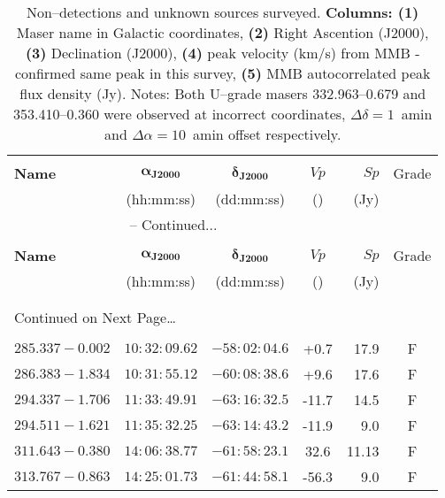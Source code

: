 \clearpage
{
\tiny
\centering
\begin{longtable}{lcccrc}
	\caption[Non--detections]{Non--detections and unknown sources surveyed. \textbf{Columns: (1)} Maser name in Galactic coordinates, \textbf{(2)} Right Ascention (J2000), \textbf{(3)} Declination (J2000), \textbf{(4)} peak velocity (km/s) from MMB - confirmed same peak in this survey, \textbf{(5)} MMB autocorrelated peak flux density (Jy). Notes: Both U--grade masers 332.963--0.679 and 353.410--0.360 were observed at incorrect coordinates, $\Delta\delta=1$~amin and $\Delta\alpha=10$~amin offset respectively.}
	\label{tab:nondetections} \\
	\hline \\[-2ex]
	\textbf{Name}  &$\boldsymbol{\alpha_\text{J2000}}$ &$\boldsymbol{\delta_\text{J2000}}$& $Vp$  & $Sp$ &  Grade \\
	&   (hh:mm:ss)                       &    (dd:mm:ss)                      & (\kms)& (Jy) &         \\ \midrule
	\endfirsthead   
	\multicolumn{4}{c}{{\bf \tablename}  {\bf \thetable{}} -- Continued...} \\[0.5ex]
	\hline \\[-2ex]
	\textbf{Name}  &$\boldsymbol{\alpha_\text{J2000}}$ &$\boldsymbol{\delta_\text{J2000}}$& $Vp$  & $Sp$ &  Grade \\
	&  (hh:mm:ss)                        & (dd:mm:ss)                        & (\kms)& (Jy) &        \\ \midrule \\[-1.8ex] 
	\endhead
	\\[-0.1ex] \hline
	\multicolumn{5}{l}{{Continued on Next Page\ldots}} \\
	\endfoot
	\\ \bottomrule
	\endlastfoot 
	$285.337-0.002$  &    $10:32:09.62$ &   $-58:02:04.6$  &   +0.7&   17.9&  F  \\
	$286.383-1.834  $&    $10:31:55.12$ &   $-60:08:38.6$  &   +9.6&   17.6&  F  \\
	$294.337-1.706  $&    $11:33:49.91$ &   $-63:16:32.5$  &  -11.7&   14.5&  F  \\
	$294.511-1.621  $&    $11:35:32.25$ &   $-63:14:43.2$  &  -11.9&    9.0&  F  \\
	$311.643-0.380  $&    $14:06:38.77$ &   $-61:58:23.1$  &   32.6&  11.13&  F  \\
	$313.767-0.863  $&    $14:25:01.73$ &   $-61:44:58.1$  &  -56.3&    9.0&  F  \\

\end{longtable}}
